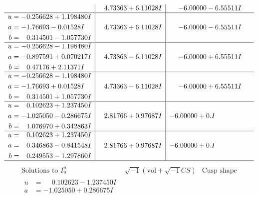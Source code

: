 \documentclass[1p]{elsarticle_modified}
\theoremstyle{definition}
\newcommand{\I}{\sqrt{-1}}
\begin{document}
$$\begin{array}{c|c|c}
 & \phantom{-}4.73363 + 6.11028 I & -6.00000 - 6.55511 I \\ \hline\begin{aligned}
u &= -0.256628 + 1.198480 I \\
a &= -1.76693 - 0.01528 I \\
b &= \phantom{-}0.314501 - 1.057730 I\end{aligned}
 & \phantom{-}4.73363 + 6.11028 I & -6.00000 - 6.55511 I \\ \hline\begin{aligned}
u &= -0.256628 - 1.198480 I \\
a &= -0.897591 + 0.070217 I \\
b &= \phantom{-}0.47176 + 2.11371 I\end{aligned}
 & \phantom{-}4.73363 - 6.11028 I & -6.00000 + 6.55511 I \\ \hline\begin{aligned}
u &= -0.256628 - 1.198480 I \\
a &= -1.76693 + 0.01528 I \\
b &= \phantom{-}0.314501 + 1.057730 I\end{aligned}
 & \phantom{-}4.73363 - 6.11028 I & -6.00000 + 6.55511 I \\ \hline\begin{aligned}
u &= \phantom{-}0.102623 + 1.237450 I \\
a &= -1.025050 - 0.286675 I \\
b &= \phantom{-}1.076970 + 0.342863 I\end{aligned}
 & \phantom{-}2.81766 + 0.97687 I & -6.00000 + 0. I\phantom{ +0.000000I} \\ \hline\begin{aligned}
u &= \phantom{-}0.102623 + 1.237450 I \\
a &= \phantom{-}0.346863 - 0.841548 I \\
b &= \phantom{-}0.249553 - 1.297860 I\end{aligned}
 & \phantom{-}2.81766 + 0.97687 I & -6.00000 + 0. I\phantom{ +0.000000I}\\
 \hline 
 \end{array}$$\newpage$$\begin{array}{c|c|c}  
\text{Solutions to }I^u_{9}& \I (\text{vol} + \sqrt{-1}CS) & \text{Cusp shape}\\
 \hline 
\begin{aligned}
u &= \phantom{-}0.102623 - 1.237450 I \\
a &= -1.025050 + 0.286675 I \\

\end{aligned}
\end{array}$$
\end{document}
